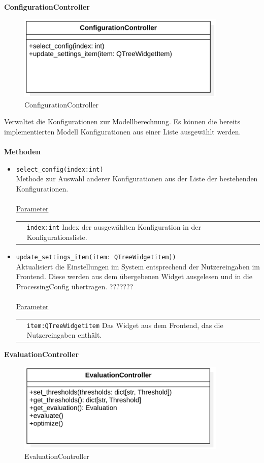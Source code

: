 \documentclass{article}
\begin{document}
\begin{itemize}
\newpage
\textbf{\large{ConfigurationController}}
\begin{figure}[H]%
    \centering
    \includegraphics[width=10cm]{entwurf/Floriane/ConfigurationController.png}
    \caption{ConfigurationController}
\end{figure}

Verwaltet die Konfigurationen zur Modellberechnung. Es können die bereits implementierten Modell Konfigurationen aus einer Liste ausgewählt werden. \\\\
\textbf{\large{Methoden}}
\begin{itemize}
\item \texttt{select\_config(index:int)}\\ Methode zur Auswahl anderer Konfigurationen aus der Liste der bestehenden Konfigurationen.\\\\
\underline{{Parameter}}\\
\begin{tabular}{lp{10.7cm}}
 & \texttt{index:int} Index der ausgewählten Konfiguration in der Konfigurationsliste. \\
\end{tabular}
\item \texttt{update\_settings\_item(item: QTreeWidgetitem))}\\ Aktualisiert die Einstellungen im System entsprechend der Nutzereingaben im Frontend. Diese werden aus dem übergebenen Widget ausgelesen und in die ProcessingConfig übertragen. ???????\\\\
\underline{{Parameter}}\\
\begin{tabular}{lp{10.7cm}}
 & \texttt{item:QTreeWidgetitem} Das Widget aus dem Frontend, das die Nutzereingaben enthält. \\
\end{tabular}
\end{itemize}


\newpage
\textbf{\large{EvaluationController}}
\begin{figure}[H]%
    \centering
    \includegraphics[width=10cm]{entwurf/Floriane/EvaluationController.png}
    \caption{EvaluationController}
\end{figure}


\end{itemize}
\end{document}
